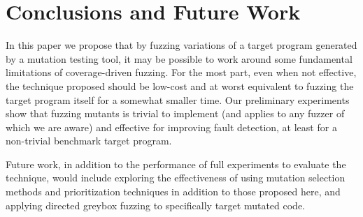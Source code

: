 \section{Conclusions and Future Work}

In this paper we propose that by fuzzing variations of a target program generated by a mutation testing tool, it may be possible to work around some fundamental limitations of coverage-driven fuzzing.  For the most part, even when not effective, the technique proposed should be low-cost and at worst equivalent to fuzzing the target program itself for a somewhat smaller time.  Our preliminary experiments show that fuzzing mutants is trivial to implement (and applies to any fuzzer of which we are aware) and effective for improving fault detection, at least for a non-trivial benchmark target program.

Future work, in addition to the performance of full experiments to evaluate the technique, would include exploring the effectiveness of using mutation selection methods and prioritization techniques in addition to those proposed here, and applying directed greybox fuzzing \cite{AFLGo} to specifically target mutated code.
